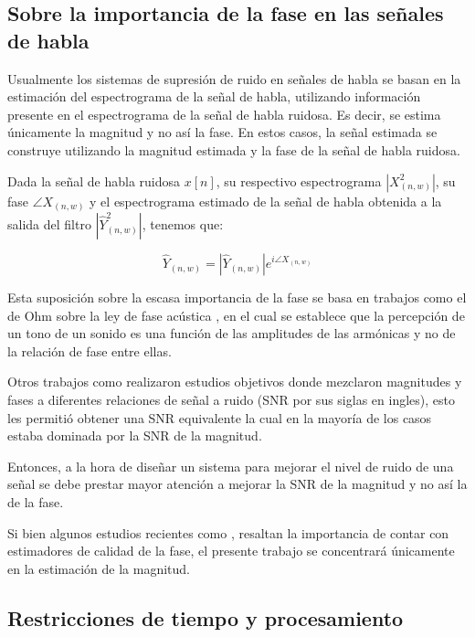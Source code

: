 \subsection{Sobre la importancia de la fase en las señales de habla} \label{sec:sobre_la_importancia_de_la_fase_en_las_señales_de_habla}

Usualmente los sistemas de supresión de ruido en señales de habla se basan en la estimación del espectrograma de la señal de habla, utilizando información presente en el espectrograma de la señal de habla ruidosa. Es decir, se estima únicamente la magnitud y no así la fase. En estos casos, la señal estimada se construye utilizando la magnitud estimada y la fase de la señal de habla ruidosa.

Dada la señal de habla ruidosa $x[n]$, su respectivo espectrograma $|X_{(n, w)}^2|$, su fase $\angle X_{(n, w)}$ y el espectrograma estimado de la señal de habla obtenida a la salida del filtro $|\hat{Y}_{(n, w)}^2|$, tenemos que:

\begin{equation*}
	\hat{Y}_{(n, w)} = |\hat{Y}_{(n, w)}| e^{i\angle X_{(n, w)}}
\end{equation*}

Esta suposición sobre la escasa importancia de la fase se basa en trabajos como el de Ohm sobre la ley de fase acústica \cite{ohm_s_law_of_acoustics}, en el cual se establece que la percepción de un tono de un sonido es una función de las amplitudes de las armónicas y no de la relación de fase entre ellas. 

Otros trabajos como \cite{the_unimportance_of_phase_in_speech_enhancement} realizaron estudios objetivos donde mezclaron magnitudes y fases a diferentes relaciones de señal a ruido (SNR por sus siglas en ingles), esto les permitió obtener una SNR equivalente la cual en la mayoría de los casos estaba dominada por la SNR de la magnitud.

Entonces, a la hora de diseñar un sistema para mejorar el nivel de ruido de una señal se debe prestar mayor atención a mejorar la SNR de la magnitud y no así la de la fase.


Si bien algunos estudios recientes como \cite{phase_importance_in_speech_processing_applications}, resaltan la importancia de contar con estimadores de calidad de la fase, el presente trabajo se concentrará únicamente en la estimación de la magnitud.


\subsection{Restricciones de tiempo y procesamiento}
\label{sec:time_restrictions}

